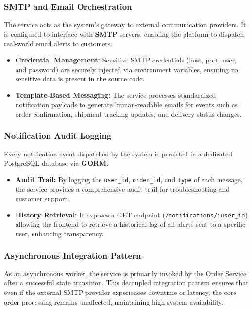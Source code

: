 \documentclass[12pt,a4paper]{report}
\begin{document}
\subsubsection{SMTP and Email Orchestration}
The service acts as the system's gateway to external communication providers. It is configured to interface with \textbf{SMTP} servers, enabling the platform to dispatch real-world email alerts to customers.
\begin{itemize}
    \item \textbf{Credential Management:} Sensitive SMTP credentials (host, port, user, and password) are securely injected via environment variables, ensuring no sensitive data is present in the source code.
    \item \textbf{Template-Based Messaging:} The service processes standardized notification payloads to generate human-readable emails for events such as order confirmation, shipment tracking updates, and delivery status changes.
\end{itemize}

\subsubsection{Notification Audit Logging}
Every notification event dispatched by the system is persisted in a dedicated PostgreSQL database via \textbf{GORM}.
\begin{itemize}
    \item \textbf{Audit Trail:} By logging the \texttt{user\_id}, \texttt{order\_id}, and \texttt{type} of each message, the service provides a comprehensive audit trail for troubleshooting and customer support.
    \item \textbf{History Retrieval:} It exposes a GET endpoint (\texttt{/notifications/:user\_id}) allowing the frontend to retrieve a historical log of all alerts sent to a specific user, enhancing transparency.
\end{itemize}

\subsubsection{Asynchronous Integration Pattern}
As an asynchronous worker, the service is primarily invoked by the Order Service after a successful state transition. This decoupled integration pattern ensures that even if the external SMTP provider experiences downtime or latency, the core order processing remains unaffected, maintaining high system availability.
\end{document}
